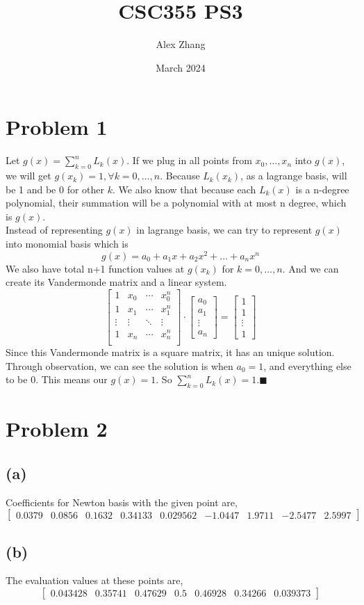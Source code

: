 \documentclass{article}
\title{CSC355 PS3}
\author{Alex Zhang}
\date{March 2024}
\newcommand{\bmat}[1]{\begin{bmatrix} #1 \end{bmatrix}}
\begin{document}
\maketitle
\section*{Problem 1}
Let $g(x) = \sum^n_{k=0}L_k(x)$. 
If we plug in all points from $x_0,\dots,x_n$ into $g(x)$, we will get $g(x_k) = 1, \forall k = 0,\dots,n$.
Because $L_k(x_k)$, as a lagrange basis, will be 1 and be 0 for other $k$.
We also know that because each $L_k(x)$ is a n-degree polynomial, their summation will be a polynomial with at most n degree, which is $g(x)$.
\\
Instead of representing $g(x)$ in lagrange basis, we can try to represent $g(x)$ into monomial basis which is 
$$g(x) = a_0 + a_1x + a_2x^2 + \dots + a_nx^n$$
We also have total n+1 function values at $g(x_k)$ for $k=0,\dots,n$. And we can create its Vandermonde matrix and a linear system.
$$\bmat{1 & x_0 & \cdots & x_0^n\\
        1 & x_1 & \cdots & x_1^n\\
        \vdots & \vdots & \ddots & \vdots\\
        1 & x_n & \cdots & x_n^n\\} \cdot \bmat{a_0 \\a_1 \\ \vdots \\a_n} = \bmat{1\\1\\\vdots\\1}$$
Since this Vandermonde matrix is a square matrix, it has an unique solution.
Through observation, we can see the solution is when $a_0 = 1$, and everything else to be $0$. This means our $g(x) = 1$.
So $\sum^n_{k=0}L_k(x) = 1.\blacksquare$





\section*{Problem 2}
\subsection*{(a)}
Coefficients for Newton basis with the given point are,
$$\bmat{0.0379    &   0.0856  &     0.1632 &     0.34133 &    0.029562 &     -1.0447     &  1.9711  &    -2.5477  &     2.5997}$$
\subsection*{(b)}
The evaluation values at these points are,
$$\bmat{0.043428   &   0.35741  &    0.47629    &      0.5   &   0.46928  &    0.34266  &   0.039373}$$
\end{document}
